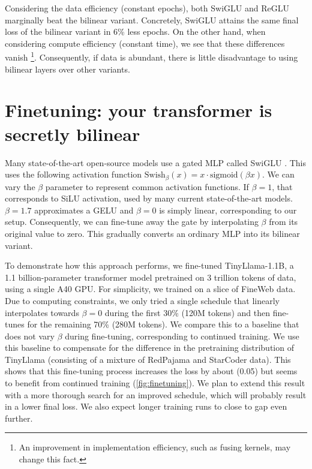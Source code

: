 \documentclass{article} %
\begin{document}
Considering the data efficiency (constant epochs), both SwiGLU and ReGLU marginally beat the bilinear variant. Concretely, SwiGLU attains the same final loss of the bilinear variant in 6\% less epochs. On the other hand, when considering compute efficiency (constant time), we see that these differences vanish \footnote{An improvement in implementation efficiency, such as fusing kernels, may change this fact.}. Consequently, if data is abundant, there is little disadvantage to using bilinear layers over other variants.

\section{Finetuning: your transformer is secretly bilinear} \label{app:finetune_glu}

Many state-of-the-art open-source models use a gated MLP called SwiGLU \citep{llama2}. This uses the following activation function $\text{Swish}_\beta(x) = x \cdot \text{sigmoid}(\beta x)$. We can vary the $\beta$ parameter to represent common activation functions. If $\beta = 1$, that corresponds to SiLU activation, used by many current state-of-the-art models. $\beta = 1.7$ approximates a GELU and $\beta = 0$ is simply linear, corresponding to our setup. Consequently, we can fine-tune away the gate by interpolating $\beta$ from its original value to zero. This gradually converts an ordinary MLP into its bilinear variant.

To demonstrate how this approach performs, we fine-tuned TinyLlama-1.1B, a 1.1 billion-parameter transformer model pretrained on 3 trillion tokens of data, using a single A40 GPU. For simplicity, we trained on a slice of FineWeb data. Due to computing constraints, we only tried a single schedule that linearly interpolates towards $\beta = 0$ during the first 30\% (120M tokens) and then fine-tunes for the remaining 70\% (280M tokens). We compare this to a baseline that does not vary $\beta$ during fine-tuning, corresponding to continued training. We use this baseline to compensate for the difference in the pretraining distribution of TinyLlama (consisting of a mixture of RedPajama and StarCoder data). 
This shows that this fine-tuning process increases the loss by about (0.05) but seems to benefit from continued training (\autoref{fig:finetuning}). We plan to extend this result with a more thorough search for an improved schedule, which will probably result in a lower final loss. We also expect longer training runs to close to gap even further.
\end{document}
